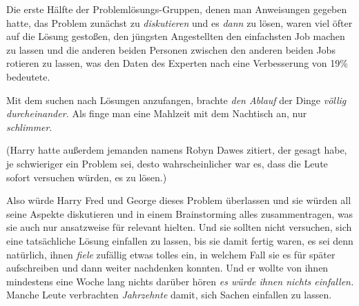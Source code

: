Die erste Hälfte der Problemlösungs-Gruppen, denen man Anweisungen gegeben hatte, das Problem zunächst zu \emph{diskutieren} und es \emph{dann} zu lösen, waren viel öfter auf die Lösung gestoßen, den jüngsten Angestellten den einfachsten Job machen zu lassen und die anderen beiden Personen zwischen den anderen beiden Jobs rotieren zu lassen, was den Daten des Experten nach eine Verbesserung von 19\% bedeutete.

Mit dem suchen nach Lösungen anzufangen, brachte \emph{den Ablauf} der Dinge \emph{völlig durcheinander.} Als finge man eine Mahlzeit mit dem Nachtisch an, nur \emph{schlimmer}.

(Harry hatte außerdem jemanden namens Robyn Dawes zitiert, der gesagt habe, je schwieriger ein Problem sei, desto wahrscheinlicher war es, dass die Leute sofort versuchen würden, es zu lösen.)

Also würde Harry Fred und George dieses Problem überlassen und sie würden all seine Aspekte diskutieren und in einem Brainstorming alles zusammentragen, was sie auch nur ansatzweise für relevant hielten. Und sie sollten nicht versuchen, sich eine tatsächliche Lösung einfallen zu lassen, bis sie damit fertig waren, es sei denn natürlich, ihnen \emph{fiele} zufällig etwas tolles ein, in welchem Fall sie es für später aufschreiben und dann weiter nachdenken konnten. Und er wollte von ihnen mindestens eine Woche lang nichts darüber hören \emph{es würde ihnen nichts einfallen.} Manche Leute verbrachten \emph{Jahrzehnte} damit, sich Sachen einfallen zu lassen.

